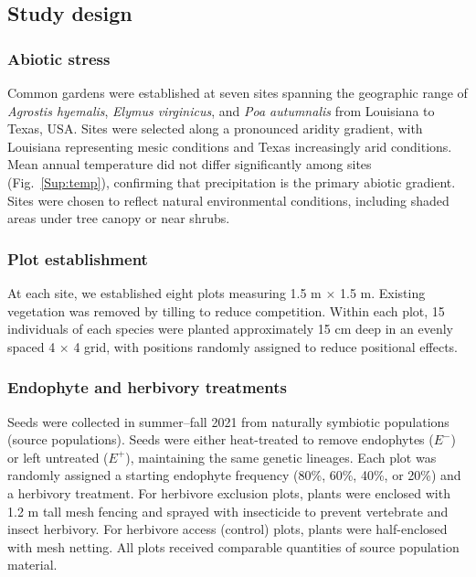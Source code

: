 \documentclass[12pt]{article}\usepackage[]{graphicx}\usepackage[dvipsnames]{xcolor}
\begin{document}
\subsection {Study design}\label{sec:study_design}
\subsubsection {Abiotic stress}
Common gardens were established at seven sites spanning the geographic range of \emph{Agrostis hyemalis}, \emph{Elymus virginicus}, and \emph{Poa autumnalis} from Louisiana to Texas, USA. Sites were selected along a pronounced aridity gradient, with Louisiana representing mesic conditions and Texas increasingly arid conditions. Mean annual temperature did not differ significantly among sites (Fig.~\ref{Sup:temp}), confirming that precipitation is the primary abiotic gradient. Sites were chosen to reflect natural environmental conditions, including shaded areas under tree canopy or near shrubs.

\subsubsection {Plot establishment}
At each site, we established eight plots measuring 1.5 m $\times$ 1.5 m. Existing vegetation was removed by tilling to reduce competition. Within each plot, 15 individuals of each species were planted approximately 15 cm deep in an evenly spaced 4 $\times$ 4 grid, with positions randomly assigned to reduce positional effects.

\subsubsection{Endophyte and herbivory treatments}
Seeds were collected in summer–fall 2021 from naturally symbiotic populations (source populations). Seeds were either heat-treated to remove endophytes ($E^-$) or left untreated ($E^+$), maintaining the same genetic lineages. Each plot was randomly assigned a starting endophyte frequency (80\%, 60\%, 40\%, or 20\%) and a herbivory treatment. For herbivore exclusion plots, plants were enclosed with 1.2 m tall mesh fencing and sprayed with insecticide to prevent vertebrate and insect herbivory. For herbivore access (control) plots, plants were half-enclosed with mesh netting. All plots received comparable quantities of source population material.

%
\end{document}
